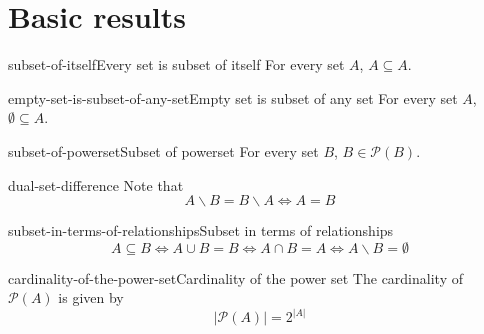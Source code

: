 \documentclass[preview]{standalone}
\begin{document}
\section{Basic results}

\begin{snippetcorollary}{subset-of-itself}{Every set is subset of itself}
    For every set \(A\), \(A \subseteq A\).
\end{snippetcorollary}

\begin{snippetcorollary}{empty-set-is-subset-of-any-set}{Empty set is subset of any set}
    For every set \(A\),
    \(\emptyset \subseteq A\).
\end{snippetcorollary}

\begin{snippetcorollary}{subset-of-powerset}{Subset of powerset}
    For every set \(B\), \(B\in\mathcal{P}(B)\).
\end{snippetcorollary}

\begin{snippetcorollary}{dual-set-difference}{}
    Note that
    \[
        A \backslash B = B \backslash A
        \iff A = B
    \]
\end{snippetcorollary}

\begin{snippetcorollary}{subset-in-terms-of-relationships}{Subset in terms of relationships}
    \[
        A \subseteq B
        \iff
        A \cup B = B
        \iff
        A \cap B = A
        \iff
        A \backslash B = \emptyset
    \]
\end{snippetcorollary}

\begin{snippettheorem}{cardinality-of-the-power-set}{Cardinality of the power set}
    The cardinality of \(\mathcal{P}(A)\) is given by
    \[
        |\mathcal{P}(A)| = 2^{|A|}
    \]
\end{snippettheorem}
\end{document}

